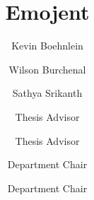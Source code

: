 \documentclass{scu-thesis}
\author{Kevin Boehnlein}
\author{Wilson Burchenal}
\author{Sathya Srikanth}
\title{Emojent}
\begin{document}
\frontmatter
\signature{Thesis Advisor}
\signature{Thesis Advisor}
\signature{Department Chair}
\signature{Department Chair}

\maketitle


\tableofcontents
\listoffigures

\mainmatter












\backmatter
\end{document}
